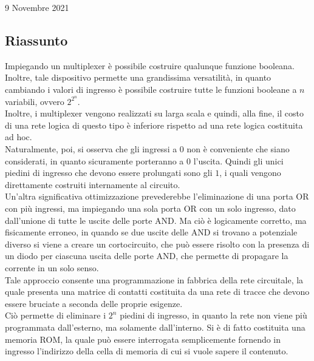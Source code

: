 \documentclass[a4paper]{extarticle}
\begin{document}
\newpage
\begin{center}
    9 Novembre 2021
\end{center}

\subsection{Riassunto}
Impiegando un multiplexer è possibile costruire qualunque funzione booleana. Inoltre, tale dispositivo permette una grandissima versatilità, in quanto cambiando i valori di ingresso è possibile costruire tutte le funzioni booleane a \(n\) variabili, ovvero \(2^{2^n}\).\\
Inoltre, i multiplexer vengono realizzati su larga scala e quindi, alla fine, il costo di una rete logica di questo tipo è inferiore rispetto ad una rete logica costituita ad hoc.\\
Naturalmente, poi, si osserva che gli ingressi a \(0\) non è conveniente che siano considerati, in quanto sicuramente porteranno a \(0\) l'uscita. Quindi gli unici piedini di ingresso che devono essere prolungati sono gli \(1\), i quali vengono direttamente costruiti internamente al circuito.\\
Un'altra significativa ottimizzazione prevederebbe l'eliminazione di una porta OR con più ingressi, ma impiegando una sola porta OR con un solo ingresso, dato dall'unione di tutte le uscite delle porte AND. Ma ciò è logicamente corretto, ma fisicamente erroneo, in quando se due uscite delle AND si trovano a potenziale diverso si viene a creare un cortocircuito, che può essere risolto con la presenza di un diodo per ciascuna uscita delle porte AND, che permette di propagare la corrente in un solo senso.\\
Tale approccio consente una programmazione in fabbrica della rete circuitale, la quale presenta una matrice di contatti costituita da una rete di tracce che devono essere bruciate a seconda delle proprie esigenze.\\
Ciò permette di eliminare i \(2^n\) piedini di ingresso, in quanto la rete non viene più programmata dall'esterno, ma solamente dall'interno. Si è di fatto costituita una memoria ROM, la quale può essere interrogata semplicemente fornendo in ingresso l'indirizzo della cella di memoria di cui si vuole sapere il contenuto.
\end{document}
